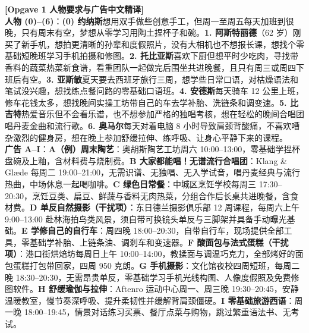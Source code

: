 \begin{transbox}
\small
\textbf{\color{NCDTeal}[Opgave 1 人物要求与广告中文精译]}\\
\textbf{人物 (0)--(6)}：\textbf{(0) 约纳斯}想用双手做些创意手工，但周一至周五每天加班到很晚，只有周末有空，梦想从零学习用陶土捏杯子和碗。\textbf{1. 阿斯特丽德}（62 岁）刚买了新手机，想拍更清晰的孙辈和度假照片，没有大相机也不想报长课，想找个零基础短晚班学习手机拍摄和修图。\textbf{2. 托比亚斯}喜欢下厨但想平时少吃肉，寻找带香料的蔬菜热菜新食谱，看重团队一起做完后围坐共进晚餐，且只有周三或周四下班后有空。\textbf{3. 亚斯敏}夏天要去西班牙旅行三周，想学些日常口语，对枯燥语法和笔试没兴趣，想找练点餐问路的零基础口语班。\textbf{4. 安德斯}每天骑车 12 公里上班，修车花钱太多，想找晚间实操工坊带自己的车去学补胎、洗链条和调变速。\textbf{5. 比吉特}热爱音乐但不会看乐谱，也不想参加严格的独唱考核，想在轻松的晚间合唱团唱丹麦金曲和流行歌。\textbf{6. 奥马尔}每天对着电脑 8 小时导致肩颈背酸痛，不喜欢嘈杂激烈的健身房，想在晚上参加舒缓拉伸、练呼吸、让身心平静下来的课程。\\[3pt]
\textbf{广告 A--I}：\textbf{A（例）周末陶艺}：奥胡斯陶艺工坊周六 10:00--13:00，零基础学捏杯盘碗及上釉，含材料费与烧制费。\textbf{B 大家都能唱！无谱流行合唱团}：Klang \& Glæde 每周二 19:00--21:00，无需识谱、无独唱、无入学试音，唱丹麦经典与流行热曲，中场休息一起喝咖啡。\textbf{C 绿色日常餐}：中城区烹饪学校每周三 17:30--20:30，烹饪豆类、扁豆、鲜蔬与香料无肉热菜，分组合作后长桌共进晚餐，含食材费。\textbf{D 单反自然摄影（干扰项）}：东日德兰摄影俱乐部 12 周课程，每周六上午 9:00--13:00 赴林海拍鸟类风景，须自带可换镜头单反与三脚架并具备手动曝光基础。\textbf{E 学修自己的自行车}：周四晚 18:00--20:30，自带自行车，现场提供全部工具，零基础学补胎、上链条油、调刹车和变速器。\textbf{F 酸面包与法式蛋糕（干扰项）}：港口街烘焙坊每周日上午 10:00--14:00，教揉面与调温巧克力，全部烤好的面包蛋糕打包带回家，四周 950 克朗。\textbf{G 手机摄影}：文化馆夜校四周短班，每周二晚 18:30--20:30，无需昂贵单反，零基础学习手机光线构图、人像度假照及免费修图软件。\textbf{H 舒缓瑜伽与拉伸}：Aftenro 运动中心周一、周三晚 19:30--20:45，安静温暖教室，慢节奏深呼吸、提升柔韧性并缓解背肩颈僵硬。\textbf{I 零基础旅游西语}：周一晚 18:00--19:45，情景对话练习买票、餐厅点菜与购物，跳过繁重语法书、无考试。
\end{transbox}


